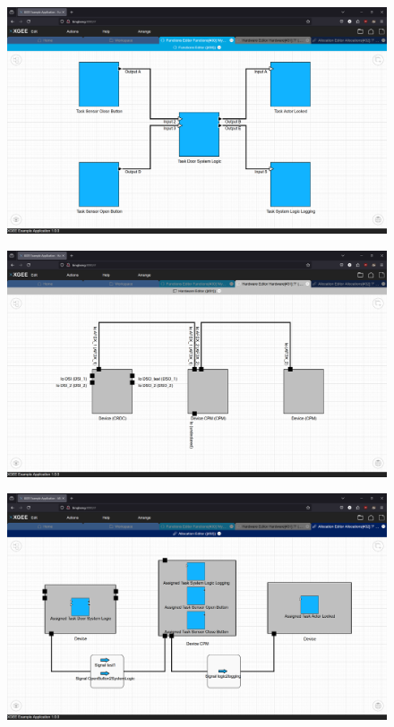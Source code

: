 \begin{figure}[htb]  \centering
    \begin{minipage}{0.32\textwidth}
        \centering
        \includegraphics[width=\textwidth]{pictures/functions_unaltered.png}
        \label{fig:functions_unaltered}
    \end{minipage}
    \hfill
    \begin{minipage}{0.32\textwidth}
        \centering
        \includegraphics[width=\textwidth]{pictures/hardware_unaltered.png}
        \label{fig:hardware_unaltered}
    \end{minipage}
    \hfill
    \begin{minipage}{0.32\textwidth}
        \centering
        \includegraphics[width=\textwidth]{pictures/allocations_unaltered.png}

\end{minipage}
\end{figure}
